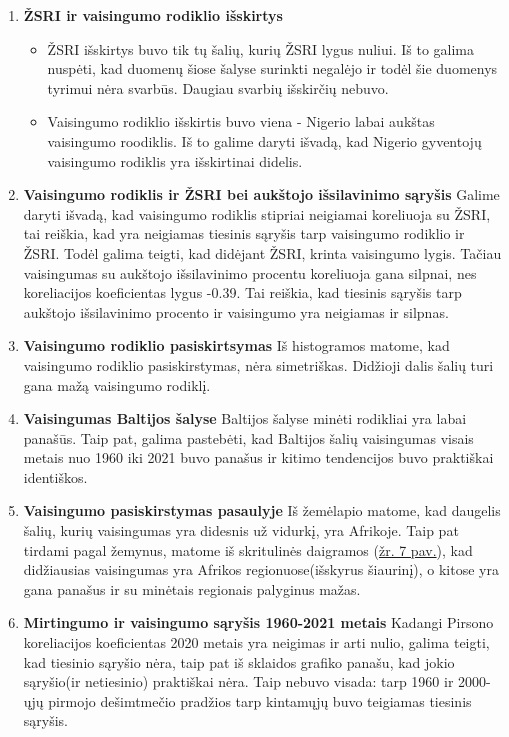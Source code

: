 \begin{enumerate}
    \item \textbf{ŽSRI ir vaisingumo rodiklio išskirtys}
    \begin{itemize}
        \item ŽSRI išskirtys buvo tik tų šalių, kurių ŽSRI lygus nuliui. Iš to galima nuspėti, kad duomenų šiose šalyse surinkti negalėjo ir todėl šie duomenys tyrimui nėra svarbūs. Daugiau svarbių išskirčių nebuvo. 
        \item Vaisingumo rodiklio išskirtis buvo viena - Nigerio labai aukštas vaisingumo roodiklis. Iš to galime daryti išvadą, kad Nigerio gyventojų vaisingumo rodiklis yra išskirtinai didelis.
    \end{itemize}

    \item \textbf{Vaisingumo rodiklis ir ŽSRI bei aukštojo išsilavinimo sąryšis}
    Galime daryti išvadą, kad vaisingumo rodiklis stipriai neigiamai koreliuoja su ŽSRI, tai reiškia, kad yra neigiamas tiesinis sąryšis tarp vaisingumo rodiklio ir ŽSRI. Todėl galima teigti, kad didėjant ŽSRI, krinta vaisingumo lygis.
    Tačiau vaisingumas su aukštojo išsilavinimo procentu koreliuoja gana silpnai, nes koreliacijos koeficientas lygus -0.39. Tai reiškia, kad tiesinis sąryšis tarp aukštojo išsilavinimo procento ir vaisingumo yra neigiamas ir silpnas.

    \item \textbf{Vaisingumo rodiklio pasiskirtsymas}
    Iš histogramos matome, kad vaisingumo rodiklio pasiskirstymas, nėra simetriškas. Didžioji dalis šalių turi gana mažą vaisingumo rodiklį. 

    \item \textbf{Vaisingumas Baltijos šalyse}
    Baltijos šalyse minėti rodikliai yra labai panašūs. Taip pat, galima pastebėti, kad Baltijos šalių vaisingumas visais metais nuo 1960 iki 2021 buvo panašus ir kitimo tendencijos buvo praktiškai identiškos.

    \item \textbf{Vaisingumo pasiskirstymas pasaulyje}
    Iš žemėlapio matome, kad daugelis šalių, kurių vaisingumas yra didesnis už vidurkį, yra Afrikoje.
    Taip pat tirdami pagal žemynus, matome iš skritulinės daigramos (\hyperlink{pie}{žr. 7 pav.}), kad didžiausias vaisingumas yra Afrikos regionuose(išskyrus šiaurinį), o kitose yra gana panašus ir su minėtais regionais palyginus mažas.

    \item \textbf{Mirtingumo ir vaisingumo sąryšis 1960-2021 metais}
    Kadangi Pirsono koreliacijos koeficientas 2020 metais yra neigimas ir arti nulio, galima teigti, kad tiesinio sąryšio nėra, taip pat iš sklaidos grafiko panašu, kad jokio sąryšio(ir netiesinio) praktiškai nėra. Taip nebuvo visada: tarp 1960 ir 2000-ųjų pirmojo dešimtmečio pradžios tarp kintamųjų buvo teigiamas tiesinis sąryšis.
\end{enumerate}